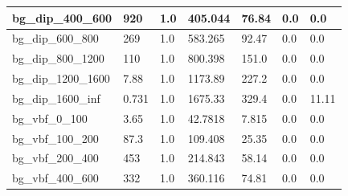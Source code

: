 \documentclass[a4paper, 10pt]{article}
\begin{document}
\begin{table}[H]
\begin{center}
\begin{tabular}{|m{23.0mm}|m{23.0mm}|m{18.0mm}|m{19.0mm}|m{19.0mm}|m{19.0mm}|m{19.0mm}|}
      \hline
      {\cellcolor{white}         bg\_dip\_400\_600}& {\cellcolor{white}         920}& {\cellcolor{white}         1.0}& {\cellcolor{white}         405.044}& {\cellcolor{white}         76.84}& {\cellcolor{green}         0.0}& {\cellcolor{green}         0.0}\\
      \hline
      {\cellcolor{white}         bg\_dip\_600\_800}& {\cellcolor{white}         269}& {\cellcolor{white}         1.0}& {\cellcolor{white}         583.265}& {\cellcolor{white}         92.47}& {\cellcolor{green}         0.0}& {\cellcolor{green}         0.0}\\
      \hline
      {\cellcolor{white}         bg\_dip\_800\_1200}& {\cellcolor{white}         110}& {\cellcolor{white}         1.0}& {\cellcolor{white}         800.398}& {\cellcolor{white}         151.0}& {\cellcolor{green}         0.0}& {\cellcolor{green}         0.0}\\
      \hline
      {\cellcolor{white}         bg\_dip\_1200\_1600}& {\cellcolor{white}         7.88}& {\cellcolor{white}         1.0}& {\cellcolor{white}         1173.89}& {\cellcolor{white}         227.2}& {\cellcolor{green}         0.0}& {\cellcolor{green}         0.0}\\
      \hline
      {\cellcolor{white}         bg\_dip\_1600\_inf}& {\cellcolor{white}         0.731}& {\cellcolor{white}         1.0}& {\cellcolor{white}         1675.33}& {\cellcolor{white}         329.4}& {\cellcolor{orange}         0.0}& {\cellcolor{orange}         11.11}\\
      \hline
      {\cellcolor{white}         bg\_vbf\_0\_100}& {\cellcolor{white}         3.65}& {\cellcolor{white}         1.0}& {\cellcolor{white}         42.7818}& {\cellcolor{white}         7.815}& {\cellcolor{green}         0.0}& {\cellcolor{green}         0.0}\\
      \hline
      {\cellcolor{white}         bg\_vbf\_100\_200}& {\cellcolor{white}         87.3}& {\cellcolor{white}         1.0}& {\cellcolor{white}         109.408}& {\cellcolor{white}         25.35}& {\cellcolor{green}         0.0}& {\cellcolor{green}         0.0}\\
      \hline
      {\cellcolor{white}         bg\_vbf\_200\_400}& {\cellcolor{white}         453}& {\cellcolor{white}         1.0}& {\cellcolor{white}         214.843}& {\cellcolor{white}         58.14}& {\cellcolor{green}         0.0}& {\cellcolor{green}         0.0}\\
      \hline
      {\cellcolor{white}         bg\_vbf\_400\_600}& {\cellcolor{white}         332}& {\cellcolor{white}         1.0}& {\cellcolor{white}         360.116}& {\cellcolor{white}         74.81}& {\cellcolor{green}         0.0}& {\cellcolor{green}         0.0}\\

\end{tabular}
\end{center}
\end{table}
\end{document}
